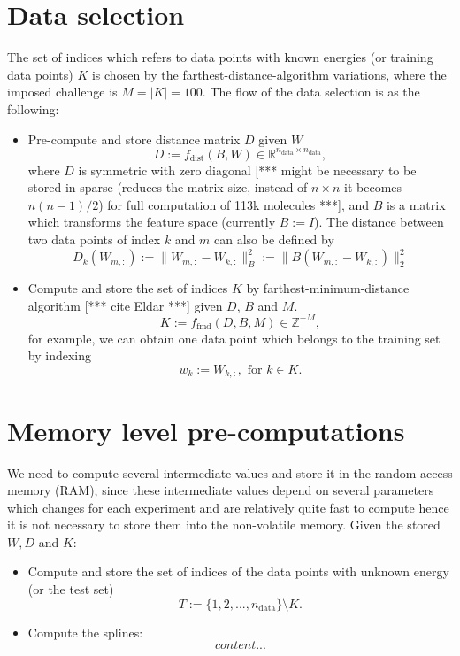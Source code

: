 \documentclass[12pt]{article}
\def\att{                    %
        \marginpar[ \hspace*{\fill} \raisebox{-0.2em}{\rule{2mm}{1.2em}} ]
        {\raisebox{-0.2em}{\rule{2mm}{1.2em}} }
        }
\def\at#1{[*** \att #1 ***]}  %
\begin{document}
\section{Data selection}
The set of indices which refers to data points with known energies (or training data points) $K$ is chosen by the farthest-distance-algorithm variations, where the imposed challenge is $M = |K| = 100$. The flow of the data selection is as the following:
\begin{itemize}
	\item Pre-compute and store distance matrix $D$ given $W$
	\begin{equation}
		D := f_{\text{dist}}(B, W) \in \mathbb{R}^{n_\text{data} \times n_\text{data}},
	\end{equation}
	where $D$ is symmetric with zero diagonal \at{might be necessary to be stored in sparse (reduces the matrix size, instead of $n \times n$ it becomes $n(n-1)/2$) for full computation of 113k molecules}, and $B$ is a matrix which transforms the feature space (currently $B := I$). The distance between two data points of index $k$ and $m$ can also be defined by
	\begin{equation}
		D_k(W_{m,:}) := \|W_{m,:} - W_{k,:}\|^2_B := \|B(W_{m,:} - W_{k,:})\|^2_2
	\end{equation}
	\item Compute and store the set of indices $K$ by farthest-minimum-distance algorithm \at{cite Eldar} given $D$, $B$ and $M$.
	\begin{equation}
		K := f_{\text{fmd}}(D, B, M) \in \mathbb{Z}^{+M},
	\end{equation}
	for example, we can obtain one data point which belongs to the training set by indexing
	\begin{equation}
		w_k := W_{k,:}, \text{ for } k \in K.
	\end{equation}
\end{itemize}
\section{Memory level pre-computations}
We need to compute several intermediate values and store it in the random access memory (RAM), since these intermediate values depend on several parameters which changes for each experiment and are relatively quite fast to compute hence it is not necessary to store them into the non-volatile memory. Given the stored $W, D$ and $K$:
\begin{itemize}
	\item Compute and store the set of indices of the data points with unknown energy (or the test set)
	\begin{equation}
		T := \{1,2,...,n_\text{data}\} \setminus K.
	\end{equation}
	\item Compute the splines:
	\begin{equation}
		content...
	\end{equation}
\end{itemize}
\end{document}
